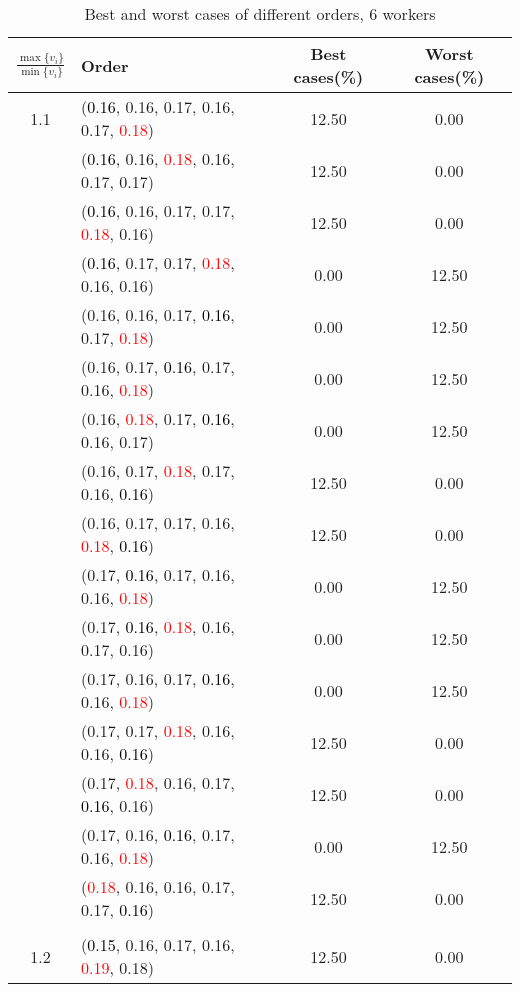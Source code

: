 \documentclass[10pt,a4paper]{report}
\begin{document}
\newpage\begin{center}
	\small
	\begin{longtable}{clcc}
		\caption{Best and worst cases of different orders, 6 workers}\\
		\toprule
		\setlength{\tabcolsep}{1mm}
		\renewcommand\baselinestretch{0.5}\selectfont
		$\frac{\max\{v_i\}}{\min\{v_i\}}$ & Order & Best cases(\%) & Worst cases(\%) \\
			\midrule		1.1			&(\textcolor{black}{0.16}, 0.16, 0.17, 0.16, 0.17, \textcolor{red}{0.18})&12.50&0.00\\
			&(\textcolor{black}{0.16}, 0.16, \textcolor{red}{0.18}, 0.16, 0.17, 0.17)&12.50&0.00\\
			&(\textcolor{black}{0.16}, 0.16, 0.17, 0.17, \textcolor{red}{0.18}, 0.16)&12.50&0.00\\
			&(\textcolor{black}{0.16}, 0.17, 0.17, \textcolor{red}{0.18}, 0.16, 0.16)&0.00&12.50\\
			&(0.16, 0.16, 0.17, \textcolor{black}{0.16}, 0.17, \textcolor{red}{0.18})&0.00&12.50\\
			&(0.16, 0.17, \textcolor{black}{0.16}, 0.17, 0.16, \textcolor{red}{0.18})&0.00&12.50\\
			&(0.16, \textcolor{red}{0.18}, 0.17, \textcolor{black}{0.16}, 0.16, 0.17)&0.00&12.50\\
			&(0.16, 0.17, \textcolor{red}{0.18}, 0.17, 0.16, \textcolor{black}{0.16})&12.50&0.00\\
			&(0.16, 0.17, 0.17, 0.16, \textcolor{red}{0.18}, \textcolor{black}{0.16})&12.50&0.00\\
			&(0.17, \textcolor{black}{0.16}, 0.17, 0.16, 0.16, \textcolor{red}{0.18})&0.00&12.50\\
			&(0.17, \textcolor{black}{0.16}, \textcolor{red}{0.18}, 0.16, 0.17, 0.16)&0.00&12.50\\
			&(0.17, 0.16, 0.17, \textcolor{black}{0.16}, 0.16, \textcolor{red}{0.18})&0.00&12.50\\
			&(0.17, 0.17, \textcolor{red}{0.18}, 0.16, 0.16, \textcolor{black}{0.16})&12.50&0.00\\
			&(0.17, \textcolor{red}{0.18}, 0.16, 0.17, \textcolor{black}{0.16}, 0.16)&12.50&0.00\\
			&(0.17, 0.16, \textcolor{black}{0.16}, 0.17, 0.16, \textcolor{red}{0.18})&0.00&12.50\\
			&(\textcolor{red}{0.18}, 0.16, 0.16, 0.17, 0.17, \textcolor{black}{0.16})&12.50&0.00\\
		&&&\\
		1.2			&(\textcolor{black}{0.15}, 0.16, 0.17, 0.16, \textcolor{red}{0.19}, 0.18)&12.50&0.00\\

\end{longtable}
\end{center}
\end{document}
